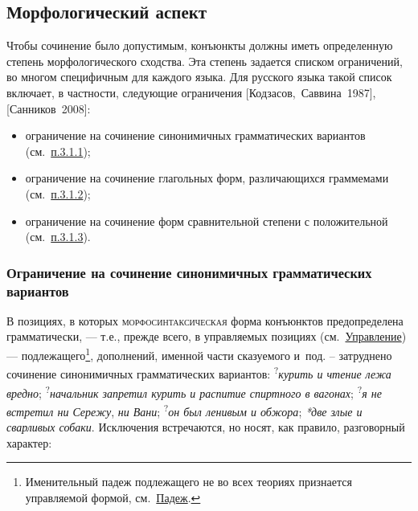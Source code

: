 \subsection{Морфологический
аспект}\label{ux43cux43eux440ux444ux43eux43bux43eux433ux438ux447ux435ux441ux43aux438ux439-ux430ux441ux43fux435ux43aux442}

Чтобы сочинение было допустимым, конъюнкты должны иметь определенную
степень морфологического сходства. Эта степень задается списком
ограничений, во многом специфичным для каждого языка. Для русского языка
такой список включает, в частности, следующие ограничения
{[}Кодзасов,~Саввина~1987{]}, {[}Санников~2008{]}:

\begin{itemize}
\item
  ограничение на сочинение синонимичных грамматических вариантов
  (см.~\underline{п.3.1.1});
\item
  ограничение на сочинение глагольных форм, различающихся граммемами
  (см.~\underline{п.3.1.2});
\item
  ограничение на сочинение форм сравнительной степени с положительной
  (см.~\underline{п.3.1.3}).
\end{itemize}

\subsubsection{Ограничение на сочинение синонимичных грамматических
вариантов}\label{ux43eux433ux440ux430ux43dux438ux447ux435ux43dux438ux435-ux43dux430-ux441ux43eux447ux438ux43dux435ux43dux438ux435-ux441ux438ux43dux43eux43dux438ux43cux438ux447ux43dux44bux445-ux433ux440ux430ux43cux43cux430ux442ux438ux447ux435ux441ux43aux438ux445-ux432ux430ux440ux438ux430ux43dux442ux43eux432}

В позициях, в которых \textsc{морфосинтаксическая} форма конъюнктов
предопределена грамматически, --- т.е., прежде всего, в управляемых
позициях (см.~\underline{Управление}) --- подлежащего\footnote{Именительный
  падеж подлежащего не во всех теориях признается управляемой формой,
  см.~\underline{Падеж}.}, дополнений, именной части сказуемого и~под.
-- затруднено сочинение синонимичных грамматических вариантов:
\textsuperscript{?}\textit{курить и чтение лежа вредно};
\textsuperscript{?}\textit{начальник запретил курить и распитие спиртного
в вагонах}; \textsuperscript{?}\textit{я не встретил ни Сережу}, \textit{ни
Вани}; \textsuperscript{?}\textit{он был ленивым и обжора}; \textit{*две
злые и сварливых собаки}. Исключения встречаются, но носят, как правило,
разговорный характер:

